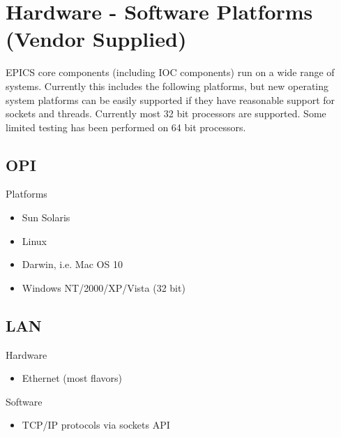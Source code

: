 \section{Hardware - Software Platforms (Vendor Supplied)}

EPICS core components (including IOC components) run on a wide range of systems. Currently this includes the 
following platforms, but new operating system platforms can be easily supported if they have reasonable support for 
sockets and threads. Currently most 32 bit processors are supported. Some limited testing has been performed on 64 bit 
processors.

\subsection{OPI}
Platforms
\begin{itemize}
\item Sun Solaris
\item Linux
\item Darwin, i.e. Mac OS 10
\item Windows NT/2000/XP/Vista (32 bit)
\end{itemize}
\subsection{LAN}
Hardware
\begin{itemize}
\item Ethernet (most flavors)
\end{itemize}
Software
\begin{itemize}
\item TCP/IP protocols via sockets API
\end{itemize}


